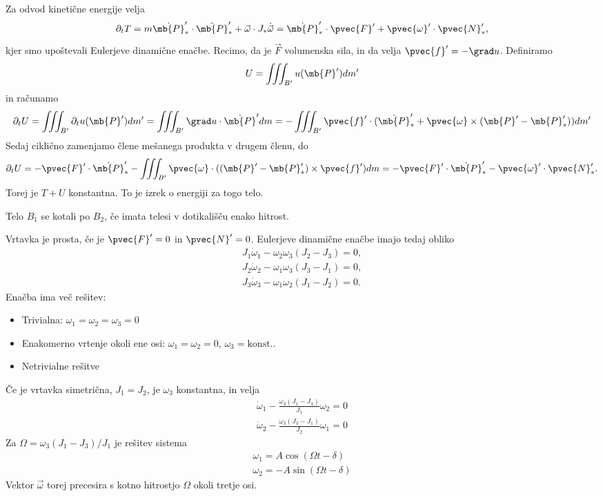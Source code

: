 Za odvod kinetične energije velja
\[
  \partial_t T
  = m \dot{\mb{P}}_*' \cdot \ddot{\mb{P}}_*' + \vec{\omega} \cdot J_*
  \dot{\vec{\omega}}
  = \dot{\mb{P}}_*' \cdot \pvec{F}' + \pvec{\omega}' \cdot \pvec{N}_*',
\]
kjer smo upoštevali Eulerjeve dinamične enačbe.
Recimo, da je $\vec{F}$ volumenska sila, in da velja $\pvec{f}' = - \grad u$.
Definiramo
\[
  U = \iiint_{B'} u(\mb{P}') dm'
\]
in računamo
\[
  \partial_t U
  = \iiint_{B'} \partial_t u(\mb{P}') dm'
  = \iiint_{B'} \grad u \cdot \dot{\mb{P}}' dm
  = - \iiint_{B'} \pvec{f}' \cdot (\dot{\mb{P}}_*' + \pvec{\omega} \times (\mb{P}'
  - \mb{P}_*')) dm'
\]
Sedaj ciklično zamenjamo člene mešanega produkta v drugem členu, do
\[
  \partial_t U
  = - \pvec{F}' \cdot \dot{\mb{P}}_*'
  - \iiint_{B'} \pvec{\omega} \cdot ((\mb{P}' - \mb{P}_*') \times \pvec{f}') dm
  = - \pvec{F}' \cdot \dot{\mb{P}}_*' - \pvec{\omega}' \cdot \pvec{N}_*'.
\]
Torej je $T + U$ konstantna.
To je izrek o energiji za togo telo.


\begin{definicija}
  Telo $B_1$ se kotali po $B_2$, če imata telesi v dotikališču enako hitrost.
\end{definicija}


Vrtavka je prosta, če je $\pvec{F}' = 0$ in $\pvec{N}' = 0$.
Eulerjeve dinamične enačbe imajo tedaj obliko
\begin{gather*}
  J_1 \dot{\omega}_1 - \omega_2 \omega_3 (J_2 - J_3) = 0, \\
  J_2 \dot{\omega}_2 - \omega_1 \omega_3 (J_3 - J_1) = 0, \\
  J_3 \dot{\omega}_3 - \omega_1 \omega_2 (J_1 - J_2) = 0.
\end{gather*}
Enačba ima več rešitev:
\begin{itemize}
\item Trivialna: $\omega_1 = \omega_2 = \omega_3 = 0$
\item Enakomerno vrtenje okoli ene osi: $\omega_1 = \omega_2 = 0$, $\omega_3 = \text{konst.}$.
\item Netrivialne rešitve
\end{itemize}

Če je vrtavka simetrična, $J_1 = J_2$, je $\omega_3$ konstantna, in velja
\begin{gather*}
  \dot{\omega}_1 - \frac{\omega_3 (J_1 - J_3)}{J_1} \omega_2 = 0 \\
  \dot{\omega}_2 - \frac{\omega_3 (J_3 - J_1)}{J_2} \omega_1 = 0
\end{gather*}
Za $\Omega = \omega_3 (J_1 - J_3) / J_1$ je rešitev sistema
\begin{gather*}
  \omega_1 = A \cos(\Omega t - \delta) \\
  \omega_2 = - A \sin(\Omega t - \delta)
\end{gather*}
Vektor $\vec{\omega}$ torej precesira s kotno hitrostjo $\Omega$ okoli tretje
osi.

